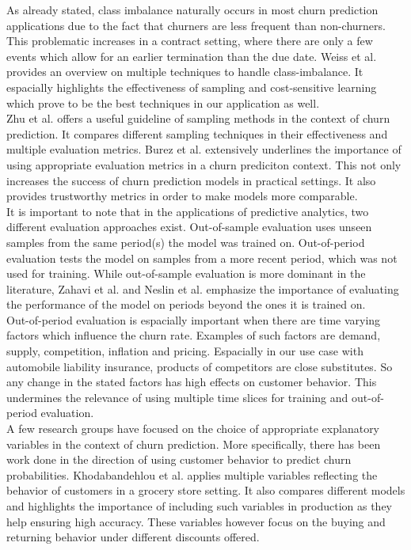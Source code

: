 \documentclass[12pt,titlepage]{article}
\begin{document}
As already stated, class imbalance naturally occurs in most churn prediction applications due to the fact that churners are less frequent than non-churners. This problematic increases in a contract setting, where there are only a few events which allow for an earlier termination than the due date. Weiss et al. \cite{mining_rarity} provides an overview on multiple techniques to handle class-imbalance. It espacially highlights the effectiveness of sampling and cost-sensitive learning which prove to be the best techniques in our application as well. \\
Zhu et al. \cite{zhu} offers a useful guideline of sampling methods in the context of churn prediction. It compares different sampling techniques in their effectiveness and multiple evaluation metrics. Burez et al. \cite{burez} extensively underlines the importance of using appropriate evaluation metrics in a churn prediciton context. This not only increases the success of churn prediction models in practical settings. It also provides trustworthy metrics in order to make models more comparable. \\
It is important to note that in the applications of predictive analytics, two different evaluation approaches exist. Out-of-sample evaluation uses unseen samples from the same period(s) the model was trained on. Out-of-period evaluation tests the model on samples from a more recent period, which was not used for training. While out-of-sample evaluation is more dominant in the literature, Zahavi et al. \cite{zahavi} and Neslin et al. \cite{neslin} emphasize the importance of evaluating the performance of the model on periods beyond the ones it is trained on. \\
Out-of-period evaluation is espacially important when there are time varying factors which influence the churn rate. Examples of such factors are demand, supply, competition, inflation and pricing. Espacially in our use case with automobile liability insurance, products of competitors are close substitutes. So any change in the stated factors has high effects on customer behavior. This undermines the relevance of using multiple time slices for training and out-of-period evaluation. \\
A few research groups have focused on the choice of appropriate explanatory variables in the context of churn prediction. More specifically, there has been work done in the direction of using customer behavior to predict churn probabilities. Khodabandehlou et al. \cite{khodabandehlou} applies multiple variables reflecting the behavior of customers in a grocery store setting. It also compares different models and highlights the importance of including such variables in production as they help ensuring high accuracy. These variables however focus on the buying and returning behavior under different discounts offered. \\
\end{document}
